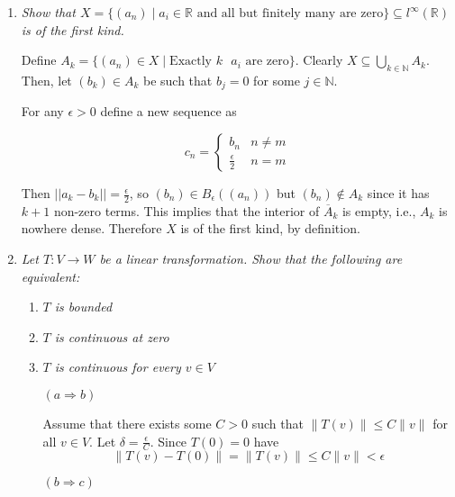 \documentclass[11pt]{article}
\begin{document}
\begin{enumerate}
(Banach space)

Let

\begin{equation*}
f(x) = 
\begin{cases}
\frac{1}{x^2} & |x| \geq 1 \\
1 & |x| < 1
\end{cases}
\end{equation*}

Then $f \in C_0(X,F)$ but $f \notin C_c(X,F)$.  Any constant function strictly satisfies the second inclusion.

\item \emph{Show that $X = \{(a_n) \mid a_i \in \mathbb{R} \mbox{ and all but finitely many are zero}\} \subseteq l^\infty(\mathbb{R})$ is of the first kind.} 

Define $A_k = \{(a_n) \in X \mid \text{Exactly $k$ $a_i$ are zero} \}$. 
Clearly $X \subseteq \bigcup_{k \in \mathbb{N}} A_k$.  Then, let $(b_k) \in A_k$ be such that $b_j = 0$ for some $j \in \mathbb{N}$.

For any $\epsilon > 0$ define a new sequence as

\begin{equation*}
c_n = 
\begin{cases}
b_n & n \neq m \\
\frac{\epsilon}{2} & n = m
\end{cases}
\end{equation*}

Then $||a_k - b_k|| = \frac{\epsilon}{2}$, so $(b_n) \in B_\epsilon((a_n))$ but $(b_n) \notin A_k$ since it has $k+1$ non-zero terms.  This implies that the interior of $\overline{A}_k$ is empty, i.e., $A_k$ is nowhere dense.  Therefore $X$ is of the first kind, by definition.

\item \emph{Let $T: V \rightarrow W$ be a linear transformation.  Show that the following are equivalent:}
\begin{enumerate}
\item \emph{$T$ is bounded}
\item \emph{$T$ is continuous at zero}
\item \emph{$T$ is continuous for every $v \in V$}
\end{enumerate}

\begin{enumerate}
\item[$(a \Rightarrow b)$]  

Assume that there exists some $C > 0$ such that $\|T(v)\| \leq C\|v\|$ for all $v \in V$.  Let $\delta = \frac{\epsilon}{C}$.  Since $T(0) = 0$ have
\[ \|T(v)- T(0)\| = \|T(v)\| \leq C\|v\| < \epsilon \]
\item[$(b \Rightarrow c)$]


\end{enumerate}
\end{enumerate}
\end{document}
